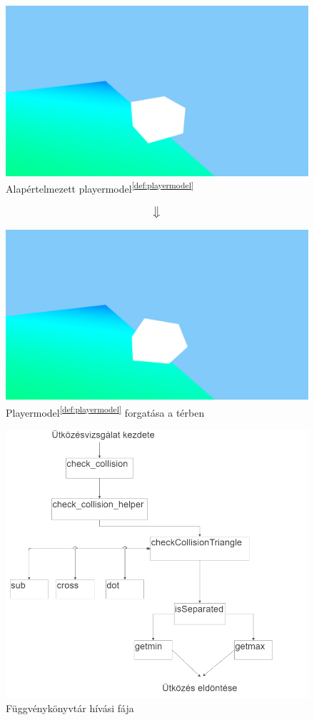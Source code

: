 \begin{figure}[h]
	\centering
	\includegraphics[width=13truecm, height=7truecm]{images/modell_4.3.2.1.png}
	\caption{Alapértelmezett playermodel\textsuperscript{\ref{def:playermodel}}}
	\label{fig:forgatas_1}
\end{figure}
$$\big\Downarrow$$
\begin{figure}[h]
	\centering
	\includegraphics[width=13truecm, height=7truecm]{images/modell_4.3.2.3.png}
	\caption{Playermodel\textsuperscript{\ref{def:playermodel}} forgatása a térben}
	\label{fig:forgatas_2}
\end{figure}

\newpage
{}



\begin{figure}[h]
	\centering
	\includegraphics[width=15truecm, height=15truecm]{images/blokk_diagram.png}
	\caption{Függvénykönyvtár hívási fája}
	\label{fig:blokkdiagram}
\end{figure}




\newpage